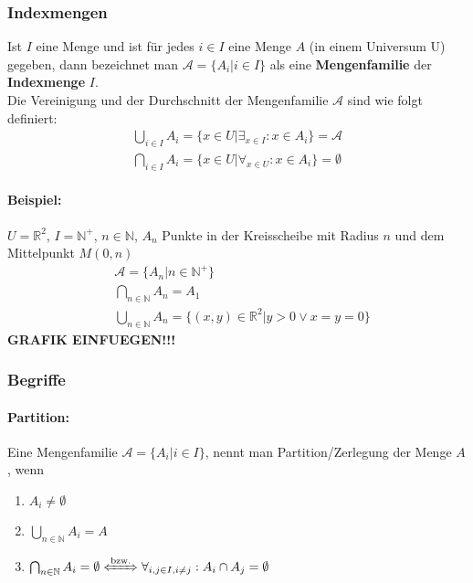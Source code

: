 \subsubsection{Indexmengen}
\begin{defi}
Ist $I$ eine Menge und ist für jedes $i\in I$ eine Menge $A$ (in einem Universum U) gegeben, dann bezeichnet man
$\mathcal{A}=\{A_i|i\in I\}$ als eine \textbf{Mengenfamilie} der \textbf{Indexmenge} $I$.\\
Die Vereinigung und der Durchschnitt der Mengenfamilie $\mathcal{A}$ sind wie folgt definiert:
\begin{align*}
\bigcup_{i\in I} A_i = \{x\in U | \exists_{x\in I}: x\in A_i\}=\mathcal{A} \\
\bigcap_{i\in I} A_i = \{x\in U | \forall_{x\in U}: x\in A_i\} =\emptyset
\end{align*}
\end{defi}

\paragraph{Beispiel:} $U=\mathbb{R}^2$, $I=\mathbb{N}^+$, $n\in\mathbb{N}$, $A_n$ Punkte in der Kreisscheibe mit Radius $n$ und dem Mittelpunkt $M(0,n)$
\begin{align*}
&\mathcal{A}=\{A_n|n\in \mathbb{N}^+\} \\
&\bigcap_{n\in\mathbb{N}}A_n=A_1 \\
&\bigcup_{n\in\mathbb{N}}A_n=\{ (x,y)\in\mathbb{R}^2 | y>0 \lor x=y=0\}
\end{align*}
\textbf{GRAFIK EINFUEGEN!!!}
\subsubsection{Begriffe}
\paragraph{Partition:}Eine Mengenfamilie $\mathcal{A}=\{A_i | i\in I\}$, nennt man Partition/Zerlegung der Menge $A$, wenn
\begin{enumerate}
\item $A_i \neq \emptyset$
\item $\bigcup_{n\in\mathbb{N}}A_i=A$
\item $\bigcap_{n\in\mathbb{N}}A_i=\emptyset \xLeftrightarrow{\text{bzw.}} \forall_{i,j\in I,i\neq j}:A_i\cap A_j=\emptyset$
\end{enumerate}

